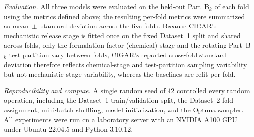 \documentclass[11pt]{article}
\begin{document}
\emph{Evaluation.} All three models were evaluated on the held-out
Part~B$_k$ of each fold using the metrics defined above; the resulting
per-fold metrics were summarized as mean~$\pm$~standard deviation across
the five folds. Because CIGAR's mechanistic release stage is fitted once
on the fixed Dataset~1 split and shared across folds, only the
formulation-factor (chemical) stage and the rotating Part~B$_k$ test
partition vary between folds; CIGAR's reported cross-fold standard
deviation therefore reflects chemical-stage and test-partition sampling
variability but not mechanistic-stage variability, whereas the baselines
are refit per fold.

\emph{Reproducibility and compute.} A single random seed of 42 controlled
every random operation, including the Dataset~1 train/validation split,
the Dataset~2 fold assignment, mini-batch shuffling, model initialization,
and the Optuna sampler. All experiments were run on a laboratory server
with an NVIDIA A100 GPU under Ubuntu 22.04.5 and Python 3.10.12.






\end{document}
